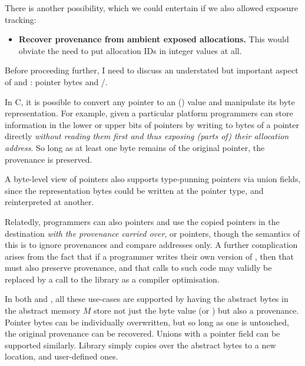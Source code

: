 There is another possibility, which we could entertain if we also allowed
exposure tracking:
\begin{itemize}
    \item \textbf{Recover provenance from ambient exposed allocations.} This
        would obviate the need to put allocation IDs in integer values at all.
\end{itemize}

Before proceeding further, I need to discuss an understated but important
aspect of  and : pointer bytes and
/.

In C, it is possible to convert any pointer to an ()
 value and manipulate its byte representation. For example,
given a particular platform programmers can store information in the lower or upper bits of
pointers by writing to bytes of a pointer directly
\emph{without reading them first and thus exposing (parts of) their allocation
address}. So long as at least one byte remains of the original pointer, the
provenance is preserved.

A byte-level view of pointers also supports type-punning pointers via union
fields, since the representation bytes could be written at the pointer type,
and reinterpreted at another.

Relatedly, programmers can also  pointers and use the copied
pointers in the destination \emph{with the provenance carried over}, or
 pointers, though the semantics of this is to ignore
provenances and compare addresses only. A further complication arises from the
fact that if a programmer writes their own version of , then
that must also preserve provenance, and that calls to such code may validly be
replaced by a call to the library  as a compiler
optimisation.

In both  and , all these use-cases are supported by
having the abstract bytes in the abstract memory $M$ store not just the
byte value (or ) but also a provenance. Pointer bytes
can be individually overwritten, but so long as one is untouched, the original
provenance can be recovered. Unions with a pointer field can be supported
similarly. Library  simply copies over the abstract bytes to a
new location, and user-defined ones.

